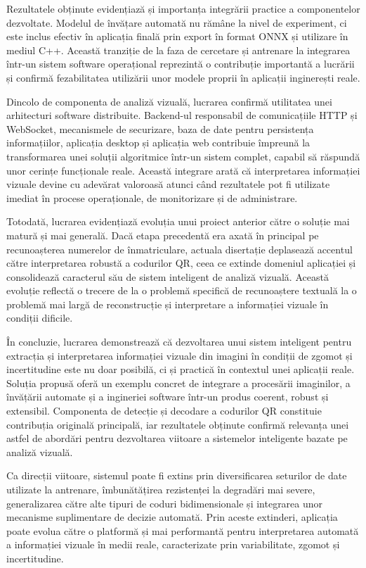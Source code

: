 Rezultatele obținute evidențiază și importanța integrării practice a componentelor dezvoltate. Modelul de învățare automată nu rămâne la nivel de experiment, ci este inclus efectiv în aplicația finală prin export în format ONNX și utilizare în mediul C++. Această tranziție de la faza de cercetare și antrenare la integrarea într-un sistem software operațional reprezintă o contribuție importantă a lucrării și confirmă fezabilitatea utilizării unor modele proprii în aplicații inginerești reale.

Dincolo de componenta de analiză vizuală, lucrarea confirmă utilitatea unei arhitecturi software distribuite. Backend-ul responsabil de comunicațiile HTTP și WebSocket, mecanismele de securizare, baza de date pentru persistența informațiilor, aplicația desktop și aplicația web contribuie împreună la transformarea unei soluții algoritmice într-un sistem complet, capabil să răspundă unor cerințe funcționale reale. Această integrare arată că interpretarea informației vizuale devine cu adevărat valoroasă atunci când rezultatele pot fi utilizate imediat în procese operaționale, de monitorizare și de administrare.

Totodată, lucrarea evidențiază evoluția unui proiect anterior către o soluție mai matură și mai generală. Dacă etapa precedentă era axată în principal pe recunoașterea numerelor de înmatriculare, actuala disertație deplasează accentul către interpretarea robustă a codurilor QR, ceea ce extinde domeniul aplicației și consolidează caracterul său de sistem inteligent de analiză vizuală. Această evoluție reflectă o trecere de la o problemă specifică de recunoaștere textuală la o problemă mai largă de reconstrucție și interpretare a informației vizuale în condiții dificile.

În concluzie, lucrarea demonstrează că dezvoltarea unui sistem inteligent pentru extracția și interpretarea informației vizuale din imagini în condiții de zgomot și incertitudine este nu doar posibilă, ci și practică în contextul unei aplicații reale. Soluția propusă oferă un exemplu concret de integrare a procesării imaginilor, a învățării automate și a ingineriei software într-un produs coerent, robust și extensibil. Componenta de detecție și decodare a codurilor QR constituie contribuția originală principală, iar rezultatele obținute confirmă relevanța unei astfel de abordări pentru dezvoltarea viitoare a sistemelor inteligente bazate pe analiză vizuală.

Ca direcții viitoare, sistemul poate fi extins prin diversificarea seturilor de date utilizate la antrenare, îmbunătățirea rezistenței la degradări mai severe, generalizarea către alte tipuri de coduri bidimensionale și integrarea unor mecanisme suplimentare de decizie automată. Prin aceste extinderi, aplicația poate evolua către o platformă și mai performantă pentru interpretarea automată a informației vizuale în medii reale, caracterizate prin variabilitate, zgomot și incertitudine.
